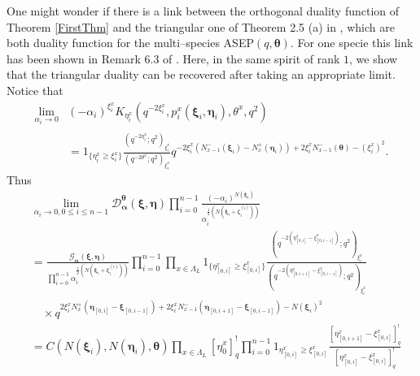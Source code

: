 \documentclass{ximera}
\begin{document}
\begin{remark}
 One might wonder if there is a link between the orthogonal duality function of Theorem \ref{FirstThm} and the triangular one of Theorem 2.5 (a) in \cite{Kuan-IMRN}, which are both duality function for the multi--species ASEP$(q,\boldsymbol{\theta})$. For one specie this link has been shown in Remark 6.3 of \cite{CFG21}. Here, in the same spirit of rank $1$, we show that the triangular duality can be recovered after taking an appropriate limit. 
    Notice that  
\begin{align*}
    \lim_{\alpha_i\xrightarrow[]{}0}&(-\alpha_i)^{\xi_i^x}K_{\eta_{i}^{x}}\left(q^{-2 \xi_{i}^{x}}, p_{i}^{x}\left(\boldsymbol\xi_{i}, \boldsymbol\eta_{i}\right), \theta^{x}, q^{2}\right)\\
   & =1_{\{\eta_i^x\ge \xi_i^x\}} \frac{\left(q^{-2\eta_i^x};q^2\right)_{\xi_i^x}}{\left(q^{-2\theta^x};q^2\right)_{\xi_i^x}}q^{-2\xi_{i}^{x}\left(N_{x-1}^{-}\left(\boldsymbol\xi_{i}\right)-N_{x}^{+}\left(\boldsymbol\eta_{i}\right)\right)+2 \xi_{i}^{x}N_{x-1}^{-}(\boldsymbol{\theta})-\left(\xi_{i}^{x}\right)^2}.
\end{align*}
Thus 
\begin{align*}
  &  \lim_{\alpha_i\xrightarrow[]{}0,0\le i\le n-1}\mathcal{D}^{\boldsymbol\theta}_{\boldsymbol{\alpha}}(\boldsymbol\xi, \boldsymbol\eta) \prod_{i=0}^{n-1}\frac{(-\alpha_i)^{N(\boldsymbol\xi_i)}}{\alpha_i^{\frac{1}{2}\left(N(\boldsymbol\xi_i+\boldsymbol\zeta^{(i)}_i)\right)}}\\
   & =\frac{\mathcal{G}_{\boldsymbol{\alpha}}(\boldsymbol\xi, \boldsymbol\eta) }{\prod_{i=0}^{n-1}\alpha_i^{\frac{1}{2}\left(N(\boldsymbol\xi_i+\boldsymbol\zeta^{(i)}_i)\right)}} \prod_{i=0}^{n-1}\prod_{x\in \Lambda_L} 1_{\{\eta_{[0,i]}^x\ge\xi_{[0,i]}^x\}}\frac{\left(q^{-2\left(\eta^x_{[0,i]}-\xi^x_{[0,i-1]}\right)};q^2\right)_{\xi_i^x}}{\left(q^{-2\left(\eta^x_{[0,i+1]}-\xi^x_{[0,i-1]}\right)};q^2\right)_{\xi_i^x}}\\
  &\quad\times q^{2\xi_{i}^{x}N_{x}^{+}\left(\boldsymbol\eta_{[0,i]}-\boldsymbol\xi_{[0,i-1]}\right)+2 \xi_{i}^{x}N_{x-1}^{-}(\boldsymbol\eta_{[0,i+1]}-\boldsymbol\xi_{[0,i-1]})-N\left(\boldsymbol\xi_{i}\right)^2}\\
  &=C(N(\boldsymbol\xi_i),N(\boldsymbol\eta_i),\boldsymbol\theta) \prod_{x \in \Lambda_L}\left[\eta_0^x\right]_q^{!} \prod_{i=0}^{n-1} 1_{\eta_{[0, i]}^x \geq \xi_{[0, i]}^x} \frac{\left[\eta_{[0, i+1]}^x-\xi_{[0, i]}^x\right]_q^{!}}{\left[\eta_{[0, i]}^x-\xi_{[0, i]}^x\right]_q^{!}}\\

\end{align*}
\end{remark}
\end{document}

